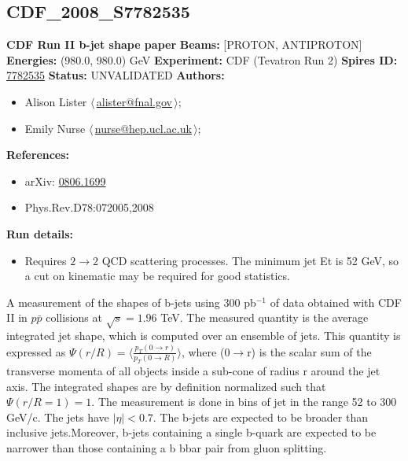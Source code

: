 \clearpage


\clearpage

\subsection[CDF\_2008\_S7782535]{CDF\_2008\_S7782535\,\cite{Aaltonen:2008de}}
\textbf{CDF Run II b-jet shape paper}\newline
\textbf{Beams:} [PROTON, ANTIPROTON] \newline
\textbf{Energies:} (980.0, 980.0) GeV \newline
\textbf{Experiment:} CDF (Tevatron Run 2) \newline
\textbf{Spires ID:} \href{http://www.slac.stanford.edu/spires/find/hep/www?rawcmd=key+7782535}{7782535}\newline
\textbf{Status:} UNVALIDATED\newline
\textbf{Authors:}
\begin{itemize}
  \item Alison Lister $\langle\,$\href{mailto:alister@fnal.gov}{alister@fnal.gov}$\,\rangle$;
  \item Emily Nurse $\langle\,$\href{mailto:nurse@hep.ucl.ac.uk}{nurse@hep.ucl.ac.uk}$\,\rangle$;
\end{itemize}
\textbf{References:}
\begin{itemize}
  \item arXiv: \href{http://arxiv.org/abs/0806.1699}{0806.1699}
  \item Phys.Rev.D78:072005,2008
\end{itemize}
\textbf{Run details:}
\begin{itemize}

  \item Requires  $2\rightarrow{2}$ QCD scattering processes. The minimum jet Et is 52 GeV, so a cut on kinematic \pTmin may be required for good statistics.\end{itemize}

\noindent A measurement of the shapes of b-jets using 300 pb$^{-1}$ of data obtained with CDF II in $p\bar{p}$ collisions at $\sqrt{s}=1.96$ TeV. The measured quantity is the average integrated jet shape, which is computed over an ensemble of jets. This quantity is expressed as $\Psi(r/R) = \langle\frac{p_T(0 \rightarrow r)}{p_T(0 \rightarrow R)}\rangle$, where \pT (0$\rightarrow$r) is the scalar sum of the transverse momenta of all objects inside a sub-cone of radius r around the jet axis. The integrated shapes are by definition normalized such that  $\Psi(r/R =1) = 1$.   The measurement is done in bins of jet \pT in the range 52 to 300 GeV/c. The jets have $|\eta| < 0.7$. The b-jets are expected to be broader than inclusive jets.Moreover, b-jets containing a single b-quark are expected to be narrower than those containing a b bbar pair from gluon splitting.

